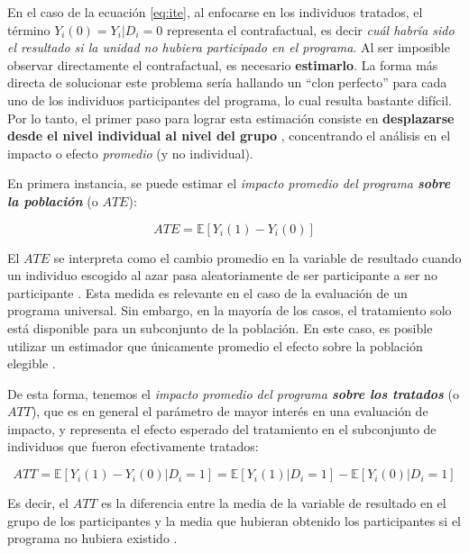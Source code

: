 \documentclass[../../main.tex]{subfiles}
\begin{document}
En el caso de la ecuación \ref{eq:ite}, al enfocarse en los individuos tratados, el término \(Y_i(0) = Y_i|D_i=0\) representa el contrafactual, es decir \textit{cuál habría sido el resultado si la unidad no hubiera participado en el programa}. Al ser imposible observar directamente el contrafactual, es necesario \textbf{estimarlo}. La forma más directa de solucionar este problema sería hallando un ``clon perfecto'' para cada uno de los individuos participantes del programa, lo cual resulta bastante difícil. Por lo tanto, el primer paso para lograr esta estimación consiste en \textbf{desplazarse desde el nivel individual al nivel del grupo} \cite{gertler-2016}, concentrando el análisis en el impacto o efecto \textit{promedio} (y no individual).

En primera instancia, se puede estimar el \textit{impacto promedio del programa \textbf{sobre la población}} (o \(ATE\)):

\begin{equation}
    ATE = \mathbb{E}\left[Y_i(1)-Y_i(0)\right]
\end{equation}

El \(ATE\) se interpreta como el cambio promedio en la variable de resultado cuando un individuo escogido al azar pasa aleatoriamente de ser participante a ser no participante \cite{bernal}. Esta medida es relevante en el caso de la evaluación de un programa universal. Sin embargo, en la mayoría de los casos, el tratamiento solo está disponible para un subconjunto de la población. En este caso, es posible utilizar un estimador que únicamente promedio el efecto sobre la población elegible \cite{bernal}. 

De esta forma, tenemos el \textit{impacto promedio del programa \textbf{sobre los tratados}} (o \(ATT\)), que es en general el parámetro de mayor interés en una evaluación de impacto, y representa el efecto esperado del tratamiento en el subconjunto de individuos que fueron efectivamente tratados:

\begin{equation}
    ATT = \mathbb{E} \left[Y_i(1)-Y_i(0)|D_i=1\right] = \mathbb{E} \left[Y_i(1)|D_i=1\right] - \mathbb{E} \left[Y_i(0)|D_i=1\right]
    \label{eq:ATT}
\end{equation}

Es decir, el \(ATT\) es la diferencia entre la media de la variable de resultado en el grupo de los participantes y la media que hubieran obtenido los participantes si el programa no hubiera existido \cite{bernal}.
\end{document}
